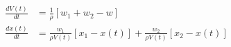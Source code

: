 \begin{equation}
  \begin{aligned}
    \frac{dV(t)}{dt} & = \frac{1}{\rho} [w_1 + w_2 - w]
    \\
    \frac{dx(t)}{dt} & = \frac{w_1}{\rho V(t)}[x_1 - x(t)] + \frac{w_2}{\rho V(t)}[x_2 - x(t)]
  \end{aligned} \label{eq:blending01_2}
\end{equation}